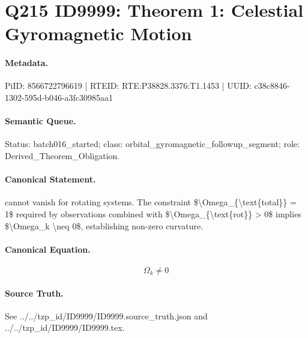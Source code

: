 \section*{Q215 ID9999: Theorem 1: Celestial Gyromagnetic Motion}
\paragraph{Metadata.}
PiID: 8566722796619 | RTEID: RTE:P38828.3376:T1.1453 | UUID: c38c8846-1302-595d-b046-a3fc30985aa1

\paragraph{Semantic Queue.}
Status: batch016\_started; class: orbital\_gyromagnetic\_followup\_segment; role: Derived\_Theorem\_Obligation.

\paragraph{Canonical Statement.}
cannot vanish for rotating systems. The constraint \$\textbackslash{}Omega\_\{\textbackslash{}text\{total\}\} = 1\$ required by observations combined with \$\textbackslash{}Omega\_\{\textbackslash{}text\{rot\}\} > 0\$ implies \$\textbackslash{}Omega\_k \textbackslash{}neq 0\$, establishing non-zero curvature.

\paragraph{Canonical Equation.}
\[
\Omega_k \neq 0
\]

\paragraph{Source Truth.}
See ../../tzp\_id/ID9999/ID9999.source\_truth.json and ../../tzp\_id/ID9999/ID9999.tex.
